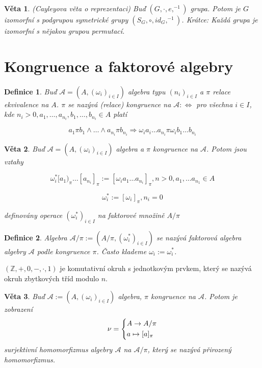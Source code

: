 \documentclass[a4paper, 11pt]{report}
\newtheorem{mydef}{Definice}[chapter]
\newtheorem{veta}{Věta}
\begin{document}
\begin{veta}
(Cayleyova věta o reprezentaci) Buď $(G, \cdot, e, ^{-1})$ grupa. Potom je $G$ izomorfní s podgrupou symetrické grupy $(S_G, \circ, id_G, ^{-1})$. Krátce: Každá grupa je izomorfní s nějakou grupou permutací.
\end{veta}

\section{Kongruence a faktorové algebry}

\begin{mydef}
Buď $\mathcal{A} = (A, (\omega_i)_{i \in I})$ algebra typu $(n_i)_{i \in I}$ a $\pi$ relace ekvivalence na $A$. $\pi$ se nazývá (relace) kongruence na $\mathcal{A} : \Leftrightarrow$ pro všechna $i \in I$, kde $n_i > 0, a_1, \dots, a_{n_i}, b_1, \dots, b_{n_i} \in A$ platí

$$ a_1 \pi b_1 \land \dots \land a_{n_i} \pi b_{n_i} \Rightarrow \omega_i a_i \dots a_{n_i} \pi \omega_i b_1 \dots b_{n_i} $$
\end{mydef}

\begin{veta}
Buď $\mathcal{A} = (A, (\omega_i)_{i \in I})$ algebra a $\pi$ kongruence na $\mathcal{A}$. Potom jsou vztahy

$$ \omega_i^*[a_1)_\pi \dots [a_{n_i}]_\pi := [\omega_i a_1 \dots a_{n_i}]_\pi, n > 0, a_1, \dots a_{n_1} \in A$$

$$ \omega_i^* := [\omega_i]_\pi, n_i = 0 $$

definovány operace $(\omega_i^*)_{i \in I}$ na faktorové množině $A/\pi$
\end{veta}

\begin{mydef}
Algebra $\mathcal{A}/\pi := (A/\pi, (\omega_i^*)_{i \in I})$ se nazývá faktorová algebra algebry $\mathcal{A}$ podle kongruence $\pi$. Často klademe $\omega_i := \omega_i^*$.
\end{mydef}

$(\mathbb{Z}, +, 0, -, \cdot, 1)$ je komutativní okruh s jednotkovým prvkem, který se nazývá okruh zbytkových tříd modulo $n$.

\begin{veta}
Buď $\mathcal{A} := (A, (\omega_i)_{i \in I})$ algebra, $\pi$ kongruence na $\mathcal{A}$. Potom je zobrazení
$$
 \nu =
   \begin{dcases}
     A \to A / \pi \\
     a \mapsto [a]_\pi
   \end{dcases}
$$
surjektivní homomorfizmus algebry $\mathcal{A}$ na $\mathcal{A}/\pi$, který se nazývá přirozený homomorfizmus.
\end{veta}
\end{document}
